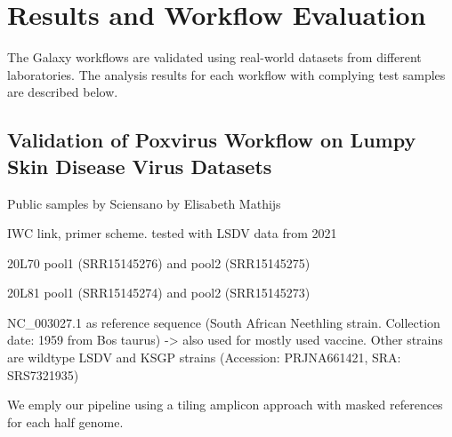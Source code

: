 \chapter{Results and Workflow Evaluation}\label{chap:results}
The Galaxy workflows are validated using real-world datasets from different laboratories. The analysis results for each workflow with complying test samples are described below.

\section{Validation of Poxvirus Workflow on Lumpy Skin Disease Virus Datasets}
\todoit
Public samples by Sciensano by Elisabeth Mathijs

\ac{IWC} link, primer scheme.
tested with \ac{LSDV} data from 2021

20L70 pool1 (SRR15145276) %
and pool2 (SRR15145275) %

20L81 pool1 (SRR15145274) %
and pool2 (SRR15145273) %

NC\_003027.1 as reference sequence (South African Neethling strain. Collection date: 1959 from Bos taurus)
-> also used for mostly used vaccine. Other strains are wildtype LSDV and KSGP strains (Accession: PRJNA661421, SRA: SRS7321935)

We emply our pipeline using a tiling amplicon approach with masked references for each half genome.


